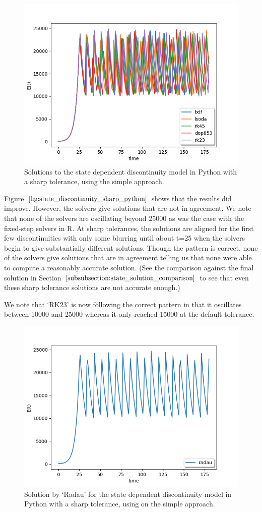 \begin{figure}[H]
\centering
\includegraphics[width=0.7\linewidth]{./figures/state_discontinuity_sharp_py}
\caption{Solutions to the state dependent discontinuity model in Python with a sharp tolerance, using the simple approach.}
\label{fig:state_discontinuity_sharp_python}
\end{figure}

Figure $\ref{fig:state_discontinuity_sharp_python}$ shows that the results did improve. However, the solvers give solutions that are not in agreement. We note that none of the solvers are oscillating beyond 25000 as was the case with the fixed-step solvers in R. At sharp tolerances, the solutions are aligned for the first few discontinuities with only some blurring until about t=25 when the solvers begin to give substantially different solutions. Though the pattern is correct, none of the solvers give solutions that are in agreement telling us that none were able to compute a reasonably accurate solution. (See the comparison against the final solution in Section $\ref{subsubsection:state_solution_comparison}$ to see that even these sharp tolerance solutions are not accurate enough.)

We note that `RK23' is now following the correct pattern in that it oscillates between 10000 and 25000 whereas it only reached 15000 at the default tolerance. 

\begin{figure}[H]
\centering
\includegraphics[width=0.7\linewidth]{./figures/state_discontinuity_sharp_radau_py}
\caption{Solution by `Radau' for the state dependent discontinuity model in Python with a sharp tolerance, using on the simple approach.}
\label{fig:state_discontinuity_sharp_radau_py}
\end{figure}

